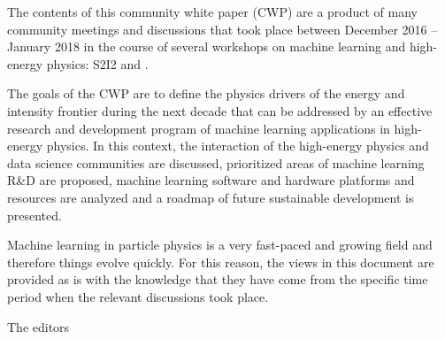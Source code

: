 The contents of this community white paper (CWP) are a product of many community meetings and discussions that took place between December 2016 -- January 2018 in the course of several workshops on machine learning and high-energy physics: S2I2 and \cite{DSatHEP2017,IML2017,ACAT2017,HSF2017}.

The goals of the CWP are to define the physics drivers of the energy and intensity frontier during the next decade that can be addressed by an effective research and development program of machine learning applications in high-energy physics. In this context, the interaction of the high-energy physics and data science communities are discussed, prioritized areas of machine learning R\&D are proposed, machine learning software and hardware platforms and resources are analyzed and a roadmap of future sustainable development is presented.

Machine learning in particle physics is a very fast-paced and growing field and therefore things evolve quickly. For this reason, the views in this document are provided as is with the knowledge that they have come from the specific time period when the relevant discussions took place.

\bigskip

The editors
